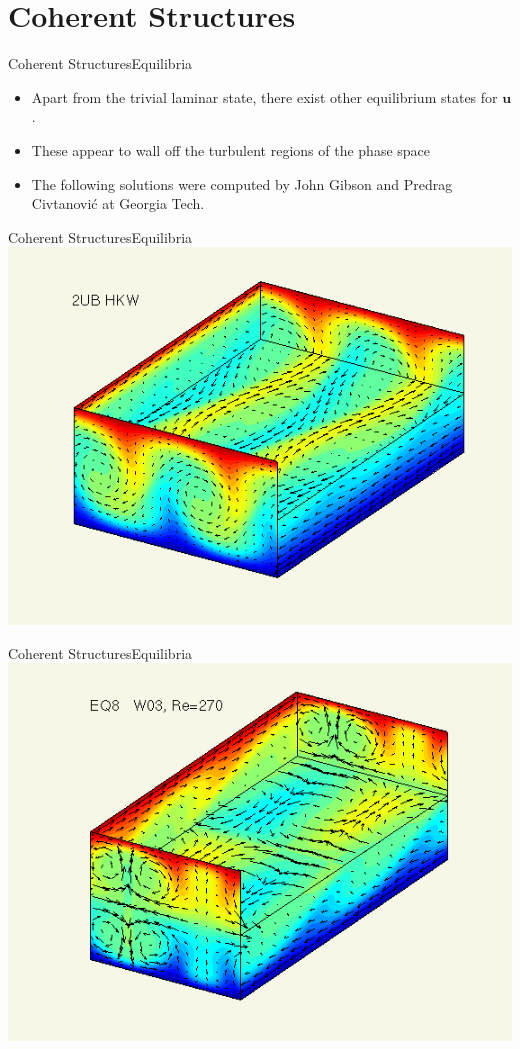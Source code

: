 \documentclass[10pt]{beamer}
\newcommand{\Vector}[1]{\mathbf{#1}}
\begin{document}
\section{Coherent Structures}
\begin{frame}{Coherent Structures}{Equilibria}
\begin{itemize}
\item<1-> Apart from the trivial laminar state, there exist other equilibrium states for $\Vector{u}$. 
\item<2-> These appear to wall off the turbulent regions of the phase space
\item<3-> The following solutions were computed by John Gibson and Predrag Civtanovi\'c at Georgia Tech.
\end{itemize}
\end{frame}
\begin{frame}{Coherent Structures}{Equilibria}
\vbox{\vspace{0.1in}\includegraphics[scale=0.45]{Data/UB}}
\end{frame}
\begin{frame}{Coherent Structures}{Equilibria}
\vbox{\vspace{0.1in}\includegraphics[scale=0.45]{Data/eq8}}
\end{frame}
\end{document}
